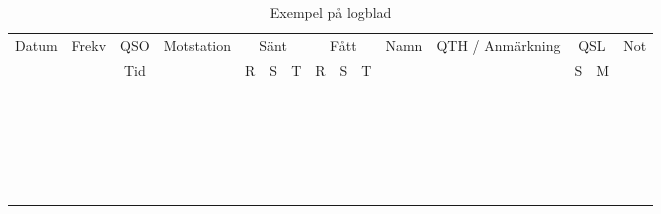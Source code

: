 \setlongtables
\begin{longtable}{|c|c|c|c|c|c|c|c|c|c|c|c|c|c|c|}
\caption{Exempel på logblad} \label{logblad} \\ \hline
Datum & Frekv & QSO & Motstation & \multicolumn{3}{c}{Sänt} & \multicolumn{3}{c}{Fått} & Namn & QTH / Anmärkning & \multicolumn{2}{c}{QSL} & Not \\
      &       & Tid &            & R & S & T                & R & S & T                &      &                  & S & M                   & \\ \hline \hline
 & & & & & & & & & & & & & & \\ \hline
 & & & & & & & & & & & & & & \\ \hline
 & & & & & & & & & & & & & & \\ \hline
 & & & & & & & & & & & & & & \\ \hline
 & & & & & & & & & & & & & & \\ \hline
 & & & & & & & & & & & & & & \\ \hline
 & & & & & & & & & & & & & & \\ \hline
 & & & & & & & & & & & & & & \\ \hline
 & & & & & & & & & & & & & & \\ \hline
 & & & & & & & & & & & & & & \\ \hline
 & & & & & & & & & & & & & & \\ \hline
 & & & & & & & & & & & & & & \\ \hline
 & & & & & & & & & & & & & & \\ \hline
 & & & & & & & & & & & & & & \\ \hline
 & & & & & & & & & & & & & & \\ \hline
 & & & & & & & & & & & & & & \\ \hline
 & & & & & & & & & & & & & & \\ \hline
 & & & & & & & & & & & & & & \\ \hline
 & & & & & & & & & & & & & & \\ \hline
 & & & & & & & & & & & & & & \\ \hline
 & & & & & & & & & & & & & & \\ \hline
 & & & & & & & & & & & & & & \\ \hline
 & & & & & & & & & & & & & & \\ \hline
\end{longtable}
